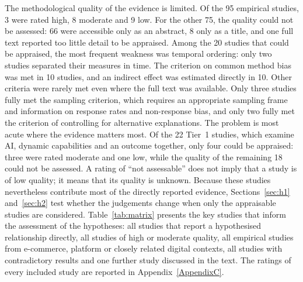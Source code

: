 The methodological quality of the evidence is limited. Of the 95 empirical studies, 3 were rated high, 8 moderate and 9 low. For the other 75, the quality could not be assessed: 66 were accessible only as an abstract, 8 only as a title, and one full text reported too little detail to be appraised. Among the 20 studies that could be appraised, the most frequent weakness was temporal ordering: only two studies separated their measures in time. The criterion on common method bias was met in 10 studies, and an indirect effect was estimated directly in 10. Other criteria were rarely met even where the full text was available. Only three studies fully met the sampling criterion, which requires an appropriate sampling frame and information on response rates and non-response bias, and only two fully met the criterion of controlling for alternative explanations. The problem is most acute where the evidence matters most. Of the 22 Tier~1 studies, which examine AI, dynamic capabilities and an outcome together, only four could be appraised: three were rated moderate and one low, while the quality of the remaining 18 could not be assessed. A rating of \enquote{not assessable} does not imply that a study is of low quality; it means that its quality is unknown. Because these studies nevertheless contribute most of the directly reported evidence, Sections~\ref{sec:h1} and~\ref{sec:h2} test whether the judgements change when only the appraisable studies are considered. Table~\ref{tab:matrix} presents the key studies that inform the assessment of the hypotheses: all studies that report a hypothesised relationship directly, all studies of high or moderate quality, all empirical studies from e-commerce, platform or closely related digital contexts, all studies with contradictory results and one further study discussed in the text. The ratings of every included study are reported in Appendix~\ref{AppendixC}.

